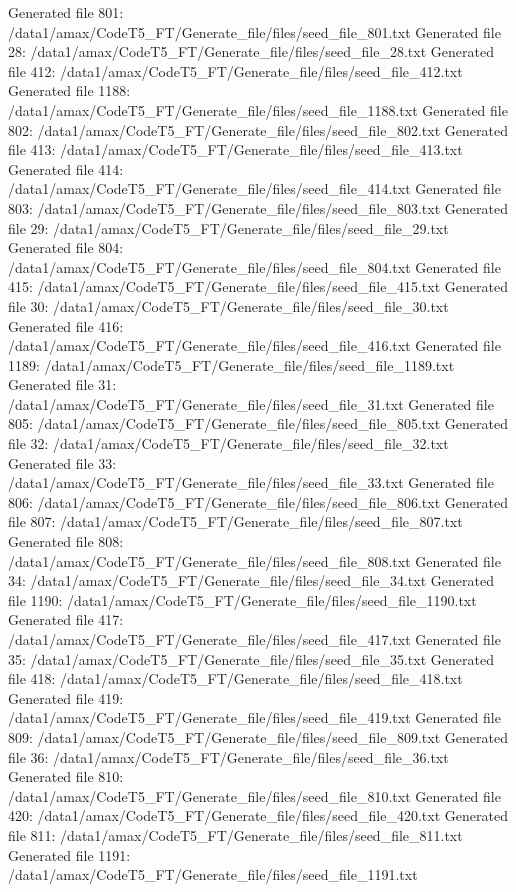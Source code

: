 Generated file 801: /data1/amax/CodeT5_FT/Generate_file/files/seed_file_801.txt
Generated file 28: /data1/amax/CodeT5_FT/Generate_file/files/seed_file_28.txt
Generated file 412: /data1/amax/CodeT5_FT/Generate_file/files/seed_file_412.txt
Generated file 1188: /data1/amax/CodeT5_FT/Generate_file/files/seed_file_1188.txt
Generated file 802: /data1/amax/CodeT5_FT/Generate_file/files/seed_file_802.txt
Generated file 413: /data1/amax/CodeT5_FT/Generate_file/files/seed_file_413.txt
Generated file 414: /data1/amax/CodeT5_FT/Generate_file/files/seed_file_414.txt
Generated file 803: /data1/amax/CodeT5_FT/Generate_file/files/seed_file_803.txt
Generated file 29: /data1/amax/CodeT5_FT/Generate_file/files/seed_file_29.txt
Generated file 804: /data1/amax/CodeT5_FT/Generate_file/files/seed_file_804.txt
Generated file 415: /data1/amax/CodeT5_FT/Generate_file/files/seed_file_415.txt
Generated file 30: /data1/amax/CodeT5_FT/Generate_file/files/seed_file_30.txt
Generated file 416: /data1/amax/CodeT5_FT/Generate_file/files/seed_file_416.txt
Generated file 1189: /data1/amax/CodeT5_FT/Generate_file/files/seed_file_1189.txt
Generated file 31: /data1/amax/CodeT5_FT/Generate_file/files/seed_file_31.txt
Generated file 805: /data1/amax/CodeT5_FT/Generate_file/files/seed_file_805.txt
Generated file 32: /data1/amax/CodeT5_FT/Generate_file/files/seed_file_32.txt
Generated file 33: /data1/amax/CodeT5_FT/Generate_file/files/seed_file_33.txt
Generated file 806: /data1/amax/CodeT5_FT/Generate_file/files/seed_file_806.txt
Generated file 807: /data1/amax/CodeT5_FT/Generate_file/files/seed_file_807.txt
Generated file 808: /data1/amax/CodeT5_FT/Generate_file/files/seed_file_808.txt
Generated file 34: /data1/amax/CodeT5_FT/Generate_file/files/seed_file_34.txt
Generated file 1190: /data1/amax/CodeT5_FT/Generate_file/files/seed_file_1190.txt
Generated file 417: /data1/amax/CodeT5_FT/Generate_file/files/seed_file_417.txt
Generated file 35: /data1/amax/CodeT5_FT/Generate_file/files/seed_file_35.txt
Generated file 418: /data1/amax/CodeT5_FT/Generate_file/files/seed_file_418.txt
Generated file 419: /data1/amax/CodeT5_FT/Generate_file/files/seed_file_419.txt
Generated file 809: /data1/amax/CodeT5_FT/Generate_file/files/seed_file_809.txt
Generated file 36: /data1/amax/CodeT5_FT/Generate_file/files/seed_file_36.txt
Generated file 810: /data1/amax/CodeT5_FT/Generate_file/files/seed_file_810.txt
Generated file 420: /data1/amax/CodeT5_FT/Generate_file/files/seed_file_420.txt
Generated file 811: /data1/amax/CodeT5_FT/Generate_file/files/seed_file_811.txt
Generated file 1191: /data1/amax/CodeT5_FT/Generate_file/files/seed_file_1191.txt
